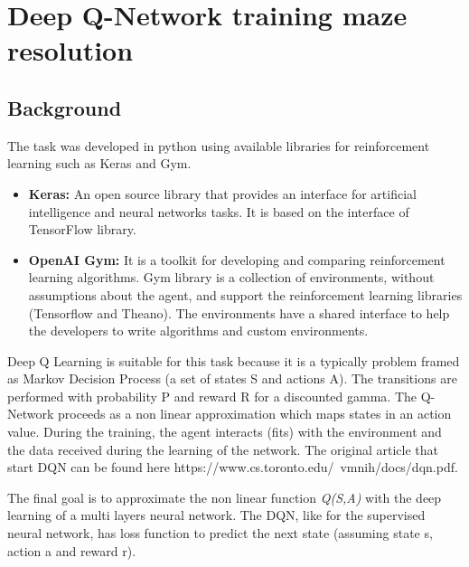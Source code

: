 \chapter{Deep Q-Network training maze resolution}
\section{Background}
The task was developed in python using available libraries for reinforcement learning such as Keras and Gym.
\begin{itemize}
    \item \textbf{Keras: }An open source library that provides an interface for artificial intelligence and neural networks tasks. It is based on the interface of TensorFlow library.
    \item \textbf{OpenAI Gym: }It is a toolkit for developing and comparing reinforcement learning algorithms. Gym library is a collection of environments, without assumptions about the agent, and support the reinforcement learning libraries (Tensorflow and Theano). The environments have a shared interface to help the developers to write algorithms and custom environments.
\end{itemize}

Deep Q Learning is suitable for this task because it is a typically problem framed as Markov Decision Process (a set of states S and actions A). The transitions are performed with probability P and reward R for a discounted gamma. 
The Q-Network proceeds as a non linear approximation which maps states in an action value. During the training, the agent interacts (fits) with the environment and the data received during the learning of the network.
The original article that start DQN can be found here https://www.cs.toronto.edu/~vmnih/docs/dqn.pdf.

The final goal is to approximate the non linear function \textit{Q(S,A)} with the deep learning of a multi layers neural network. The DQN, like for the supervised neural network, has loss function to predict the next state (assuming state s, action a and reward r).

